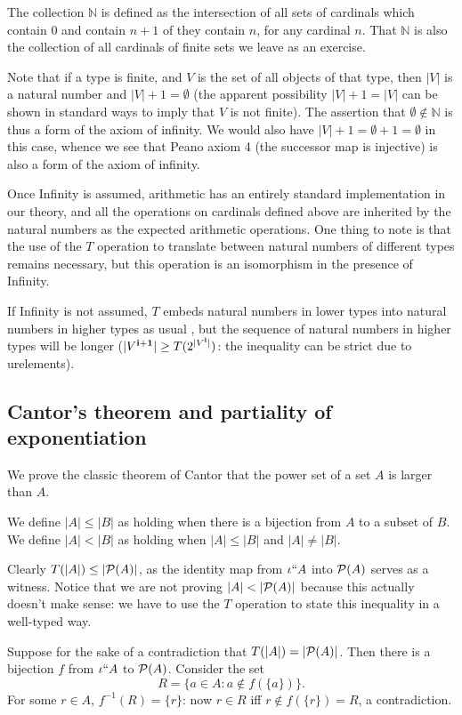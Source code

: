 \documentclass[12pt]{article}
\begin{document}
The collection $\mathbb N$ is defined as the intersection of all sets of cardinals which contain 0 and contain $n+1$ of they contain $n$, for any cardinal $n$.  That $\mathbb N$ is also the collection of all cardinals of finite sets we leave as an exercise.

Note that if a type is finite, and $V$ is the set of all objects of that type, then $|V|$ is a natural number and $|V|+1 = \emptyset$ (the apparent possibility $|V|+1 = |V|$ can be shown in standard ways to imply that $V$ is not finite).  The assertion that $\emptyset \not\in \mathbb N$ is thus a form of the axiom of infinity.  We would also have $|V|+1 = \emptyset +1 = \emptyset$ in this case, whence we see that Peano axiom 4 (the successor map is injective) is also a form of the axiom of infinity.

Once Infinity is assumed, arithmetic has an entirely standard implementation in our theory, and all the operations on cardinals defined above are inherited by the natural numbers as the expected arithmetic operations.  One thing to note is that the use of the $T$ operation to translate between natural numbers of different types remains necessary, but this operation is an isomorphism in the presence of Infinity.

If Infinity is not assumed, $T$ embeds natural numbers in lower types into natural numbers in higher types as usual , but the sequence of natural numbers in higher types will be longer ($|V^{\bf i+1}| \geq T(2^{|V^{\bf i}|})$:  the inequality can be strict due to urelements).  

\subsection{Cantor's theorem and partiality of exponentiation}

We prove the classic theorem of Cantor that the power set of a set $A$ is larger than $A$.

We define $|A| \leq |B|$ as holding when there is a bijection from $A$ to a subset of $B$.  We define $|A| < |B|$ as holding when $|A| \leq |B|$ and $|A| \neq |B|$.

Clearly $T(|A|) \leq |{\cal P}(A)|$, as the identity map from $\iota``A$ into ${\cal P}(A)$ serves as a witness.  Notice that we are not proving $|A| < |{\cal P}(A)|$ because this actually doesn't make sense:  we have to use the $T$ operation to state this inequality in a well-typed way.

Suppose for the sake of a contradiction that $T(|A|) = |{\cal P}(A)|$.  Then there is a bijection $f$ from $\iota``A$ to ${\cal P}(A)$.  Consider the set $$R = \{a \in A:a \not\in f(\{a\})\}.$$   For some $r \in A$, $f^{-1}(R) = \{r\}$:
now $r \in R$ iff $r \not\in f(\{r\}) = R$, a contradiction.
\end{document}

